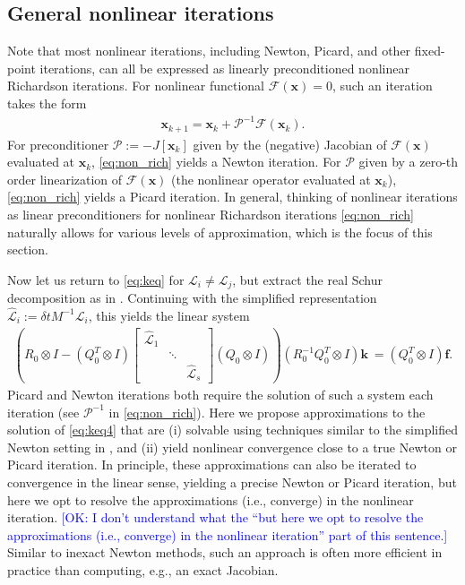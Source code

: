 \documentclass[review]{siamart}
\newcommand{\OK}[1]{\textcolor{blue}{[OK: #1]}}
\begin{document}
\subsection{General nonlinear iterations}\label{sec:nonlinear:gen}

Note that most nonlinear iterations, including Newton, Picard, and
other fixed-point iterations, can all be expressed as linearly preconditioned
nonlinear Richardson iterations. For nonlinear functional
$\mathcal{F}(\mathbf{x}) = 0$, such an iteration takes the form
%
\begin{align}\label{eq:non_rich}
\mathbf{x}_{k+1} = \mathbf{x}_k + \mathcal{P}^{-1}\mathcal{F}(\mathbf{x}_k).
\end{align}
%
For preconditioner $\mathcal{P} := -J[\mathbf{x}_k]$ given by the (negative)
Jacobian of $\mathcal{F}(\mathbf{x})$ evaluated at $\mathbf{x}_k$, \eqref{eq:non_rich}
yields a Newton iteration. For $\mathcal{P}$ given by a zero-th order linearization
of $\mathcal{F}(\mathbf{x})$ (the nonlinear operator evaluated at $\mathbf{x}_k$),
\eqref{eq:non_rich} yields a Picard iteration. In general, thinking of nonlinear
iterations as linear preconditioners for nonlinear Richardson iterations
\eqref{eq:non_rich} naturally allows for various levels of approximation,
which is the focus of this section.

Now let us return to \eqref{eq:keq} for $\mathcal{L}_i\neq\mathcal{L}_j$, but
extract the real Schur decomposition as in . Continuing
with the simplified representation $\widehat{\mathcal{L}}_i := \delta t M^{-1}\mathcal{L}_i$,
this yields the linear system
%
\begin{align}\label{eq:keq4}
\left( R_0\otimes I - (Q_0^T\otimes I) \begin{bmatrix}
	\widehat{\mathcal{L}}_1  & \\ & \ddots \\ && \widehat{\mathcal{L}}_s\end{bmatrix}
	(Q_0\otimes I)\right) (R_0^{-1}Q_0^T\otimes I) \mathbf{k}\
= (Q_0^T\otimes I)\mathbf{f}.
\end{align}
%
Picard and Newton iterations both require the solution of such a system each
iteration (see $\mathcal{P}^{-1}$ in \eqref{eq:non_rich}). Here we propose
approximations to the solution of \eqref{eq:keq4} that are (i) solvable using
techniques similar to the simplified Newton setting in , and
(ii) yield nonlinear  convergence close to a true Newton or Picard iteration. In principle,
these approximations can also be iterated to convergence in the linear sense, yielding
a precise Newton or Picard iteration, but here we opt to resolve the approximations
(i.e., converge) in the nonlinear iteration.
%
\OK{I don't understand what the ``but here we opt to resolve the approximations
(i.e., converge) in the nonlinear iteration'' part of this sentence.}
% 
Similar to inexact Newton methods,
such an approach is often more efficient in practice than computing, e.g., an exact
Jacobian.
\end{document}
